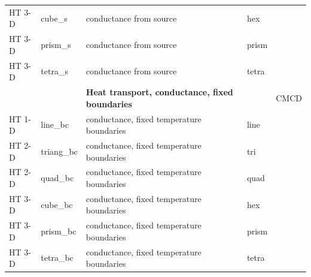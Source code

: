 \begin{center}
\begin{tabular*}{12.7cm}{|p{1.5cm}|p{1.8cm}|p{4.78cm}|p{1cm}|p{1.5cm}|}
HT  3-D    & cube\_s & conductance from source & hex &\\
HT  3-D    & prism\_s & conductance from source & prism &\\
HT  3-D    & tetra\_s & conductance from source & tetra &\\
\hline
           &             & \textbf{Heat transport, conductance, fixed boundaries} & & CMCD\\
HT  1-D    & line\_bc & conductance, fixed temperature boundaries   & line &\\
HT  2-D    & triang\_bc & conductance, fixed temperature boundaries  & tri &\\
HT  2-D    & quad\_bc & conductance, fixed temperature boundaries  & quad &\\
HT  3-D    & cube\_bc & conductance, fixed temperature boundaries  & hex &\\
HT  3-D    & prism\_bc & conductance, fixed temperature boundaries  & prism &\\
HT  3-D    & tetra\_bc & conductance, fixed temperature boundaries  & tetra &\\
\hline
\end{tabular*}
\end{center}
